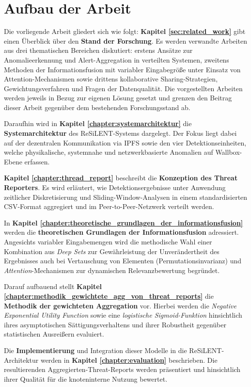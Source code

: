 \section{Aufbau der Arbeit}

Die vorliegende Arbeit gliedert sich wie folgt: \textbf{Kapitel \ref{sec:related_work}} gibt einen Überblick über den \textbf{Stand der Forschung}. Es werden verwandte Arbeiten aus drei thematischen Bereichen diskutiert: erstens Ansätze zur Anomalieerkennung und Alert-Aggregation in verteilten Systemen, zweitens Methoden der Informationsfusion mit variabler Eingabegröße unter Einsatz von Attention-Mechanismen sowie drittens kollaborative Sharing-Strategien, Gewichtungsverfahren und Fragen der Datenqualität. Die vorgestellten Arbeiten werden jeweils in Bezug zur eigenen Lösung gesetzt und grenzen den Beitrag dieser Arbeit gegenüber dem bestehenden Forschungsstand ab.

Daraufhin wird in \textbf{Kapitel \ref{chapter:systemarchitektur}}  die \textbf{Systemarchitektur} des ReSiLENT-Systems dargelegt. Der Fokus liegt dabei auf der dezentralen Kommunikation via IPFS sowie den vier Detektionseinheiten, welche physikalische, systemnahe und netzwerkbasierte Anomalien auf Wallbox-Ebene erfassen.

\textbf{Kapitel \ref{chapter:thread_report}} beschreibt die \textbf{Konzeption des Threat Reporters}. Es wird erläutert, wie Detektionsergebnisse unter Anwendung zeitlicher Diskretisierung und Sliding-Window-Analysen in einem standardisierten CSV-Format aggregiert und im Peer-to-Peer-Netzwerk verteilt werden.

In \textbf{Kapitel \ref{chapter:theoretische_grundlagen_der_informationsfusion}} werden die \textbf{theoretischen Grundlagen der Informationsfusion} adressiert. Angesichts variabler Eingabemengen wird die methodische Wahl einer Kombination aus \textit{Deep Sets} zur Gewährleistung der Unverändertheit des Ergebnisses auch bei Vertauschung von Elementen (Permutationsinvarianz) und \textit{Attention}-Mechanismen zur dynamischen Relevanzbewertung begründet.

Darauf aufbauend stellt \textbf{Kapitel \ref{chapter:methodik_gewichtete_agg_von_threat_reports}} die \textbf{Methodik der gewichteten Aggregation} vor. Hierbei werden die \textit{Negative Exponential Utility Function} sowie eine \textit{logistische Sigmoid-Funktion} hinsichtlich ihres asymptotischen Sättigungsverhaltens und ihrer Robustheit gegenüber statistischen Ausreißern evaluiert.

Die \textbf{Implementierung} und Integration dieser Modelle in die ReSiLENT-Architektur werden in \textbf{Kapitel \ref{chapter:evaluation}} beschrieben. Die resultierenden Aggregierten-Threat-Reports werden präsentiert und hinsichtlich ihrer Qualität für die knoteninterne Nutzung bewertet.

